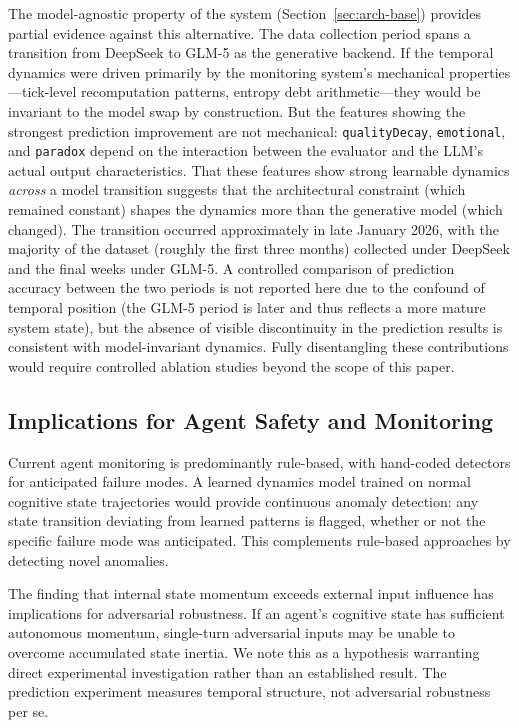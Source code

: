 \documentclass[twoside,11pt]{article}
\begin{document}
The model-agnostic property of the system (Section~\ref{sec:arch-base})
provides partial evidence against this alternative. The data collection period
spans a transition from DeepSeek to GLM-5 as the generative backend. If the
temporal dynamics were driven primarily by the monitoring system's mechanical
properties---tick-level recomputation patterns, entropy debt arithmetic---they
would be invariant to the model swap by construction. But the features showing
the strongest prediction improvement are not mechanical: \texttt{qualityDecay},
\texttt{emotional}, and \texttt{paradox} depend on the interaction between the
evaluator and the LLM's actual output characteristics. That these features show
strong learnable dynamics \emph{across} a model transition suggests that the
architectural constraint (which remained constant) shapes the dynamics more than
the generative model (which changed). The transition occurred approximately in
late January 2026, with the majority of the dataset (roughly the first three
months) collected under DeepSeek and the final weeks under GLM-5. A controlled
comparison of prediction accuracy between the two periods is not reported here
due to the confound of temporal position (the GLM-5 period is later and thus
reflects a more mature system state), but the absence of visible discontinuity
in the prediction results is consistent with model-invariant dynamics. Fully
disentangling these contributions would require controlled ablation studies
beyond the scope of this paper.

\subsection{Implications for Agent Safety and Monitoring}
\label{sec:discuss-safety}

Current agent monitoring is predominantly rule-based, with hand-coded detectors
for anticipated failure modes. A learned dynamics model trained on normal
cognitive state trajectories would provide continuous anomaly detection: any
state transition deviating from learned patterns is flagged, whether or not the
specific failure mode was anticipated. This complements rule-based approaches
by detecting novel anomalies.

The finding that internal state momentum exceeds external input influence has
implications for adversarial robustness. If an agent's cognitive state has
sufficient autonomous momentum, single-turn adversarial inputs may be unable
to overcome accumulated state inertia. We note this as a hypothesis warranting
direct experimental investigation rather than an established result. The
prediction experiment measures temporal structure, not adversarial robustness
per se.
\end{document}
